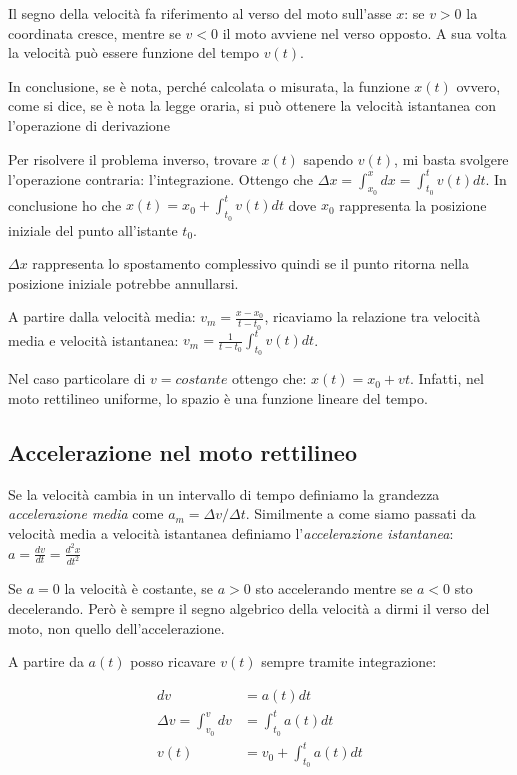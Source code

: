 \documentclass[class=book, crop=false, oneside, 12pt]{standalone}
\begin{document}
Il segno della velocità fa riferimento al verso del moto sull'asse
\(x\): se \(v >0\) la coordinata cresce, mentre se \(v < 0\) il moto
avviene nel verso opposto. A sua volta la velocità può essere funzione
del tempo \(v(t)\).

In conclusione, se è nota, perché calcolata o misurata, la funzione
\(x(t)\) ovvero, come si dice, se è nota la legge oraria, si può
ottenere la velocità istantanea con l'operazione di derivazione

Per risolvere il problema inverso, trovare \(x(t)\) sapendo \(v(t)\), mi
basta svolgere l'operazione contraria: l'integrazione. Ottengo che
\(\Delta x = \int_{x_0}^{x} dx = \int_{t_0}^{t} v(t) dt\). In
conclusione ho che \(x(t) = x_0 + \int_{t_0}^t v(t) dt\) dove \(x_0\)
rappresenta la posizione iniziale del punto all'istante \(t_0\).

\(\Delta x\) rappresenta lo spostamento complessivo quindi se il punto
ritorna nella posizione iniziale potrebbe annullarsi.

A partire dalla velocità media: \(v_m = \frac {x-x_0} {t-t_0}\),
ricaviamo la relazione tra velocità media e velocità istantanea:
\(v_m = \frac {1} {t-t_0} \int_{t_0}^t v(t) dt\).

Nel caso particolare di \(v = costante\) ottengo che:
\(x(t) = x_0 + vt\). Infatti, nel moto rettilineo uniforme, lo spazio è
una funzione lineare del tempo.

\subsection{Accelerazione nel moto rettilineo}

Se la velocità cambia in un intervallo di tempo definiamo la grandezza
\emph{accelerazione media} come \(a_m = \Delta v / \Delta t\).
Similmente a come siamo passati da velocità media a velocità istantanea
definiamo l'\emph{accelerazione istantanea}:
\(a = \frac {dv} {dt} = \frac {d^2 x}{dt^2}\)

Se \(a=0\) la velocità è costante, se \(a>0\) sto accelerando mentre se
\(a<0\) sto decelerando. Però è sempre il segno algebrico della velocità
a dirmi il verso del moto, non quello dell'accelerazione.

A partire da \(a(t)\) posso ricavare \(v(t)\) sempre tramite
integrazione:

\begin{equation}
  \begin{aligned}
    dv &= a(t) dt\\
    \Delta v = \int_{v_0}^{v}dv &= \int_{t_0}^t a(t) dt\\
    v(t) &= v_0 + \int_{t_0}^{t} a(t) dt
  \end{aligned}
\end{equation}
\end{document}
